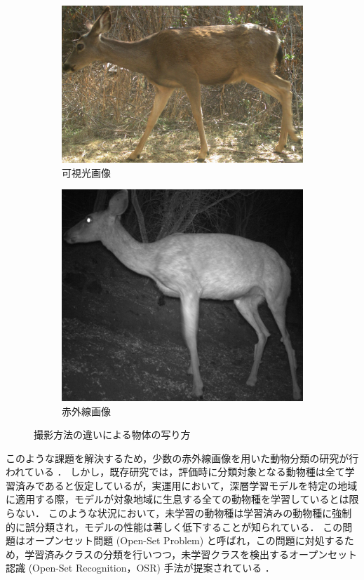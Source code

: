 \documentclass[a4paper,11pt,nomag]{jsreport}
\begin{document}
\begin{figure}[tbp]
  \centering
  \begin{subfigure}[b]{0.45\linewidth}
    \centering
    \includegraphics[height=0.7\linewidth, keepaspectratio]{cct_color_deer.png}
    \caption{可視光画像}
    \label{fig:color_deer}
  \end{subfigure}
  \hfill
  \begin{subfigure}[b]{0.45\linewidth}
    \centering
    \includegraphics[height=0.7\linewidth, keepaspectratio]{cct_infrared_deer.png}
    \caption{赤外線画像}
    \label{fig:infrared_deer}
  \end{subfigure}
  \caption{撮影方法の違いによる物体の写り方}
  \label{fig:camera}
\end{figure}

このような課題を解決するため，少数の赤外線画像を用いた動物分類の研究が行われている \cite{kishimoto2023}．
しかし，既存研究では，評価時に分類対象となる動物種は全て学習済みであると仮定しているが，実運用において，深層学習モデルを特定の地域に適用する際，モデルが対象地域に生息する全ての動物種を学習しているとは限らない．
このような状況において，未学習の動物種は学習済みの動物種に強制的に誤分類され，モデルの性能は著しく低下することが知られている．
この問題はオープンセット問題 (Open-Set Problem) と呼ばれ，この問題に対処するため，学習済みクラスの分類を行いつつ，未学習クラスを検出するオープンセット認識 (Open-Set Recognition，OSR) 手法が提案されている \cite{sun2020, sagar2022}．
\end{document}
